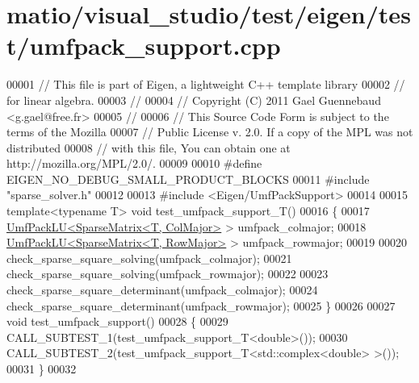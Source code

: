 \hypertarget{matio_2visual__studio_2test_2eigen_2test_2umfpack__support_8cpp_source}{}\section{matio/visual\+\_\+studio/test/eigen/test/umfpack\+\_\+support.cpp}
\label{matio_2visual__studio_2test_2eigen_2test_2umfpack__support_8cpp_source}

\begin{DoxyCode}
00001 \textcolor{comment}{// This file is part of Eigen, a lightweight C++ template library}
00002 \textcolor{comment}{// for linear algebra.}
00003 \textcolor{comment}{//}
00004 \textcolor{comment}{// Copyright (C) 2011 Gael Guennebaud <g.gael@free.fr>}
00005 \textcolor{comment}{//}
00006 \textcolor{comment}{// This Source Code Form is subject to the terms of the Mozilla}
00007 \textcolor{comment}{// Public License v. 2.0. If a copy of the MPL was not distributed}
00008 \textcolor{comment}{// with this file, You can obtain one at http://mozilla.org/MPL/2.0/.}
00009 
00010 \textcolor{preprocessor}{#define EIGEN\_NO\_DEBUG\_SMALL\_PRODUCT\_BLOCKS}
00011 \textcolor{preprocessor}{#include "sparse\_solver.h"}
00012 
00013 \textcolor{preprocessor}{#include <Eigen/UmfPackSupport>}
00014 
00015 \textcolor{keyword}{template}<\textcolor{keyword}{typename} T> \textcolor{keywordtype}{void} test\_umfpack\_support\_T()
00016 \{
00017   \hyperlink{class_eigen_1_1_umf_pack_l_u}{UmfPackLU<SparseMatrix<T, ColMajor>} > umfpack\_colmajor;
00018   \hyperlink{class_eigen_1_1_umf_pack_l_u}{UmfPackLU<SparseMatrix<T, RowMajor>} > umfpack\_rowmajor;
00019   
00020   check\_sparse\_square\_solving(umfpack\_colmajor);
00021   check\_sparse\_square\_solving(umfpack\_rowmajor);
00022   
00023   check\_sparse\_square\_determinant(umfpack\_colmajor);
00024   check\_sparse\_square\_determinant(umfpack\_rowmajor);
00025 \}
00026 
00027 \textcolor{keywordtype}{void} test\_umfpack\_support()
00028 \{
00029   CALL\_SUBTEST\_1(test\_umfpack\_support\_T<double>());
00030   CALL\_SUBTEST\_2(test\_umfpack\_support\_T<std::complex<double> >());
00031 \}
00032 
\end{DoxyCode}
